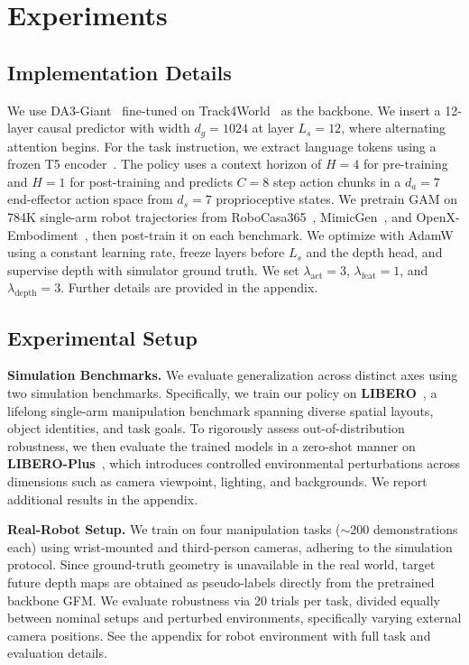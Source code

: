 
\section{Experiments}
\label{sec:exp}
\subsection{Implementation Details}


We use DA3-Giant~\citep{lin2025depth} fine-tuned on Track4World~\citep{lu2026track4world} as the backbone. We insert a 12-layer causal predictor with width $d_g=1024$ at layer $L_s=12$, where alternating attention begins. For the task instruction, we extract language tokens using a frozen T5 encoder~\citep{raffel2020exploring}. The policy uses a context horizon of $H=4$ for pre-training and $H=1$ for post-training and predicts $C=8$ step action chunks in a $d_a=7$ end-effector action space from $d_s=7$ proprioceptive states. We pretrain GAM on 784K single-arm robot trajectories from RoboCasa365~\citep{nasiriany2026robocasa365}, MimicGen~\citep{mandlekar2023mimicgen}, and OpenX-Embodiment~\citep{collaboration2023open}, then post-train it on each benchmark. We optimize with AdamW using a constant learning rate, freeze layers before $L_s$ and the depth head, and supervise depth with simulator ground truth. We set $\lambda_{\text{act}}=3$, $\lambda_{\text{feat}}=1$, and $\lambda_{\text{depth}}=3$. Further details are provided in the appendix.


\subsection{Experimental Setup}
\label{sec:exp:setup}


\noindent\textbf{Simulation Benchmarks.}
We evaluate generalization across distinct axes using two simulation benchmarks. Specifically, we train our policy on \textbf{LIBERO}~\citep{liu2023libero}, a lifelong single-arm manipulation benchmark spanning diverse spatial layouts, object identities, and task goals. To rigorously assess out-of-distribution robustness, we then evaluate the trained models in a zero-shot manner on \textbf{LIBERO-Plus}~\citep{fei2025libero}, which introduces controlled environmental perturbations across dimensions such as camera viewpoint, lighting, and backgrounds. We report additional results in the appendix.





\noindent\textbf{Real-Robot Setup.}
We train on four manipulation tasks ($\sim$200 demonstrations each) using wrist-mounted and third-person cameras, adhering to the simulation protocol. Since ground-truth geometry is unavailable in the real world, target future depth maps are obtained as pseudo-labels directly from the pretrained backbone GFM. We evaluate robustness via 20 trials per task, divided equally between nominal setups and perturbed environments, specifically varying external camera positions. See the appendix for robot environment with full task and evaluation details.


